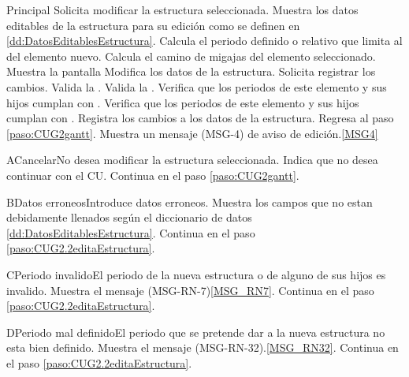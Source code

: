 	\begin{UCtrayectoria}{Principal}
		\UCpaso[\UCactor] Solicita modificar la estructura seleccionada.
		\UCpaso Muestra los datos editables de la estructura para su edición como se definen en \ref{dd:DatosEditablesEstructura}. \label{paso:CUG2.2editaEstructura}
		\UCpaso Calcula el periodo definido o relativo que limita al del elemento nuevo.
		\UCpaso Calcula el camino de migajas del elemento seleccionado.
		\UCpaso Muestra la pantalla 
		\UCpaso [\UCactor] Modifica los datos de la estructura.
		\UCpaso [\UCactor] Solicita registrar los cambios. 
		\UCpaso Valida la  .
		\UCpaso Valida la  . 
		\UCpaso Verifica que los periodos de este elemento y sus hijos cumplan con  .
		\UCpaso Verifica que los periodos de este elemento y sus hijos cumplan con  .
		\UCpaso Registra los cambios a los datos de la estructura.
		\UCpaso Regresa al paso \ref{paso:CUG2gantt}.
		\UCpaso Muestra un mensaje (MSG-4) de aviso de edición.\ref{MSG4}
	\end{UCtrayectoria}

	\begin{UCtrayectoriaA}{A}{Cancelar}{No desea modificar la estructura seleccionada.}
		\UCpaso[\UCactor] Indica que no desea continuar con el CU.
		\UCpaso Continua en el paso \ref{paso:CUG2gantt}.
	\end{UCtrayectoriaA}

	\begin{UCtrayectoriaA}{B}{Datos erroneos}{Introduce datos erroneos.}
		\UCpaso Muestra los campos que no estan debidamente llenados según el diccionario de datos \ref{dd:DatosEditablesEstructura}.
		\UCpaso Continua en el paso \ref{paso:CUG2.2editaEstructura}.
	\end{UCtrayectoriaA}

	\begin{UCtrayectoriaA}{C}{Periodo invalido}{El periodo de la nueva estructura o de alguno de sus hijos es invalido.}
		\UCpaso Muestra el mensaje (MSG-RN-7)\ref{MSG_RN7}.
		\UCpaso Continua en el paso \ref{paso:CUG2.2editaEstructura}.
	\end{UCtrayectoriaA}

	\begin{UCtrayectoriaA}{D}{Periodo mal definido}{El periodo que se pretende dar a la nueva estructura no esta bien definido.}
		\UCpaso Muestra el mensaje (MSG-RN-32).\ref{MSG_RN32}.
		\UCpaso Continua en el paso \ref{paso:CUG2.2editaEstructura}.
	\end{UCtrayectoriaA}


